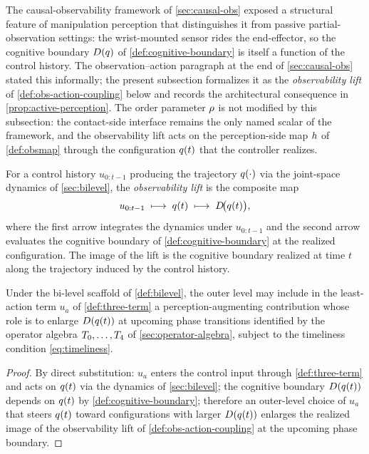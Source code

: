 The causal-observability framework of \cref{sec:causal-obs}
exposed a structural feature of manipulation perception that
distinguishes it from passive partial-observation settings: the
wrist-mounted sensor rides the end-effector, so the cognitive
boundary $D(q)$ of \cref{def:cognitive-boundary} is
itself a function of the control history. The
observation--action paragraph at the end of
\cref{sec:causal-obs} stated this informally; the present
subsection formalizes it as the \emph{observability lift} of
\cref{def:obs-action-coupling} below and records the
architectural consequence in
\cref{prop:active-perception}. The order parameter
$\rho$ is not modified by this subsection: the contact-side
interface remains the only named scalar of the framework, and
the observability lift acts on the perception-side map
$h$ of \cref{def:obsmap} through the configuration
$q(t)$ that the controller realizes.

\begin{definition}\label{def:obs-action-coupling}
For a control history $u_{0:t-1}$ producing the trajectory
$q(\cdot)$ via the joint-space dynamics of
\cref{sec:bilevel}, the \emph{observability lift} is the
composite map
\[
  u_{0:t-1}
  \;\longmapsto\;
  q(t)
  \;\longmapsto\;
  D\!\bigl(q(t)\bigr),
\]
where the first arrow integrates the dynamics under
$u_{0:t-1}$ and the second arrow evaluates the cognitive
boundary of \cref{def:cognitive-boundary} at the realized
configuration. The image of the lift is the cognitive boundary
realized at time $t$ along the trajectory induced by the
control history.
\end{definition}

\begin{proposition}
\label{prop:active-perception}
Under the bi-level scaffold of \cref{def:bilevel}, the outer
level may include in the least-action term $u_{a}$ of
\cref{def:three-term} a perception-augmenting contribution
whose role is to enlarge $D(q(t))$ at upcoming
phase transitions identified by the operator algebra
$T_{0}, \ldots, T_{4}$ of
\cref{sec:operator-algebra}, subject to the timeliness
condition \eqref{eq:timeliness}.
\end{proposition}

\begin{proof}
By direct substitution: $u_{a}$ enters the control input
through \cref{def:three-term} and acts on $q(t)$ via
the dynamics of \cref{sec:bilevel}; the cognitive boundary
$D(q(t))$ depends on $q(t)$ by
\cref{def:cognitive-boundary}; therefore an outer-level choice
of $u_{a}$ that steers $q(t)$ toward configurations
with larger $D(q(t))$ enlarges the realized image of
the observability lift of
\cref{def:obs-action-coupling} at the upcoming phase boundary.
\end{proof}


